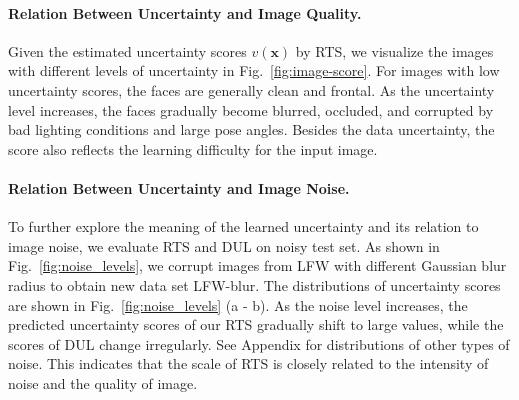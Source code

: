 \documentclass[letterpaper]{article} %
\begin{document}
\paragraph{Relation Between Uncertainty and Image Quality.}
Given the estimated uncertainty scores $v(\bm{x})$ by RTS, we visualize the images with different levels of uncertainty in Fig.~\ref{fig:image-score}. For images with low uncertainty scores, the faces are generally clean and frontal. As the uncertainty level increases, the faces gradually become blurred, occluded, and corrupted by bad lighting conditions and large pose angles. Besides the data uncertainty, the score also reflects the learning difficulty for the input image.

\paragraph{Relation Between Uncertainty and Image Noise.}
To further explore the meaning of the learned uncertainty and its relation to image noise, we evaluate RTS and DUL on noisy test set. As shown in Fig.~\ref{fig:noise_levels}, we corrupt images from LFW with different Gaussian blur radius to obtain new data set LFW-blur.
The distributions of uncertainty scores are shown in Fig.~\ref{fig:noise_levels} (a - b). As the noise level increases, the predicted uncertainty scores of our RTS gradually shift to large values, while the scores of DUL change irregularly.
See Appendix for distributions of other types of noise.
This indicates that the scale of RTS is closely related to the intensity of noise and the quality of image.
\end{document}
